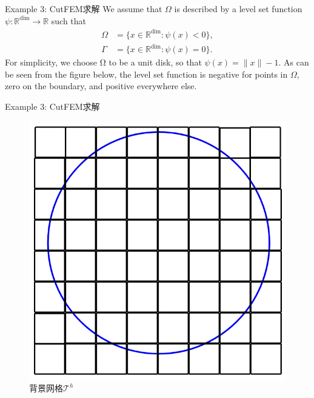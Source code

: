 \documentclass[lang=en,aspectratio=43,theme=default,logo=on]{simplebeamer}
\begin{document}
\begin{frame}{Example 3: CutFEM求解}
We assume that $\Omega$ is described by a level set function $\psi : \mathbb{R}^{\mathrm{dim}}\rightarrow \mathbb{R}$ such that
\begin{align*}
    \Omega &= \{x \in \mathbb{R}^{\text{dim}} : \psi(x) < 0 \}, \\
    \Gamma &= \{x \in \mathbb{R}^{\text{dim}} : \psi(x) = 0 \}.
\end{align*}
For simplicity, we choose Ω to be a unit disk, so that $\psi(x) = \| x \| - 1$. As can be seen from the figure below, the level set function is negative for points in $\Omega$, zero on the boundary, and positive everywhere else.
\end{frame}

\begin{frame}{Example 3: CutFEM求解}
    \begin{figure}
        \centering %
        \begin{minipage}[t]{0.5\linewidth}
            \centering
            \includegraphics[height=0.6\textheight]{./img/018.png}
            \caption{背景网格$\mathcal{T}^h$}
        \end{minipage}%
        \begin{minipage}[t]{0.5\linewidth}
            \centering

\end{minipage}
\end{figure}
\end{frame}
\end{document}
